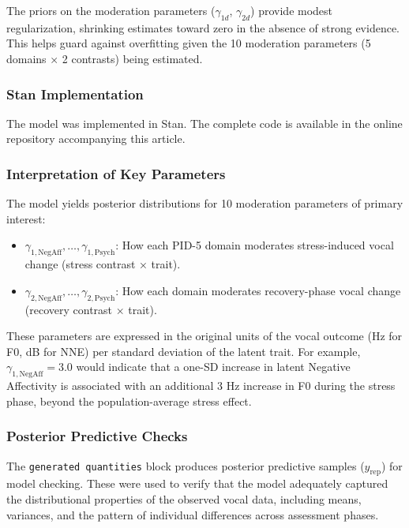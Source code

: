 \documentclass[
  english,
  man,floatsintext]{apa6}
\providecommand{\tightlist}{%
  \setlength{\itemsep}{0pt}\setlength{\parskip}{0pt}}
\begin{document}
The priors on the moderation parameters (\(\gamma_{1d}\), \(\gamma_{2d}\)) provide modest regularization, shrinking estimates toward zero in the absence of strong evidence. This helps guard against overfitting given the 10 moderation parameters (5 domains × 2 contrasts) being estimated.

\subsubsection{Stan Implementation}\label{stan-implementation}

The model was implemented in Stan. The complete code is available in the online repository accompanying this article.

\subsubsection{Interpretation of Key Parameters}\label{interpretation-of-key-parameters}

The model yields posterior distributions for 10 moderation parameters of primary interest:

\begin{itemize}
\tightlist
\item
  \(\gamma_{1,\text{NegAff}}, \ldots, \gamma_{1,\text{Psych}}\): How each PID-5 domain moderates stress-induced vocal change (stress contrast × trait).
\item
  \(\gamma_{2,\text{NegAff}}, \ldots, \gamma_{2,\text{Psych}}\): How each domain moderates recovery-phase vocal change (recovery contrast × trait).
\end{itemize}

These parameters are expressed in the original units of the vocal outcome (Hz for F0, dB for NNE) per standard deviation of the latent trait. For example, \(\gamma_{1,\text{NegAff}} = 3.0\) would indicate that a one-SD increase in latent Negative Affectivity is associated with an additional 3 Hz increase in F0 during the stress phase, beyond the population-average stress effect.

\subsubsection{Posterior Predictive Checks}\label{posterior-predictive-checks}

The \texttt{generated\ quantities} block produces posterior predictive samples (\(y_{\text{rep}}\)) for model checking. These were used to verify that the model adequately captured the distributional properties of the observed vocal data, including means, variances, and the pattern of individual differences across assessment phases.
\end{document}

